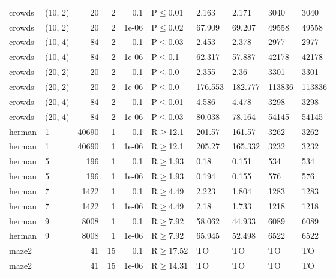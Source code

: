 \begin{longtable}{llrrrlllll}
 crowds        & (10, 2)   &     	20 &   2 & 0.1   & P$\leq$0.01  & 2.163    & 2.171    & 3040   & 3040   \\
 crowds        & (10, 2)   &     	20 &   2 & 1e-06 & P$\leq$0.02  & 67.909   & 69.207   & 49558  & 49558  \\
 crowds        & (10, 4)   &     	84 &   2 & 0.1   & P$\leq$0.03  & 2.453    & 2.378    & 2977   & 2977   \\
 crowds        & (10, 4)   &     	84 &   2 & 1e-06 & P$\leq$0.1   & 62.317   & 57.887   & 42178  & 42178  \\
 crowds        & (20, 2)   &     	20 &   2 & 0.1   & P$\leq$0.0   & 2.355    & 2.36     & 3301   & 3301   \\
 crowds        & (20, 2)   &     	20 &   2 & 1e-06 & P$\leq$0.0   & 176.553  & 182.777  & 113836 & 113836 \\
 crowds        & (20, 4)   &     	84 &   2 & 0.1   & P$\leq$0.01  & 4.586    & 4.478    & 3298   & 3298   \\
 crowds        & (20, 4)   &     	84 &   2 & 1e-06 & P$\leq$0.03  & 80.038   & 78.164   & 54145  & 54145  \\
 herman        & 1         &  	40690 &   1 & 0.1   & R$\geq$12.1  & 201.57   & 161.57   & 3262   & 3262   \\
 herman        & 1         &  	40690 &   1 & 1e-06 & R$\geq$12.1  & 205.27   & 165.332  & 3232   & 3232   \\
 herman        & 5         &    	196 &   1 & 0.1   & R$\geq$1.93  & 0.18     & 0.151    & 534    & 534    \\
 herman        & 5         &    	196 &   1 & 1e-06 & R$\geq$1.93  & 0.194    & 0.155    & 576    & 576    \\
 herman        & 7         &   	1422 &   1 & 0.1   & R$\geq$4.49  & 2.223    & 1.804    & 1283   & 1283   \\
 herman        & 7         &   	1422 &   1 & 1e-06 & R$\geq$4.49  & 2.18     & 1.733    & 1218   & 1218   \\
 herman        & 9         &   	8008 &   1 & 0.1   & R$\geq$7.92  & 58.062   & 44.933   & 6089   & 6089   \\
 herman        & 9         &   	8008 &   1 & 1e-06 & R$\geq$7.92  & 65.945   & 52.498   & 6522   & 6522   \\
 maze2         &           &     	41 &  15 & 0.1   & R$\geq$17.52 & TO       & TO       & TO     & TO     \\
 maze2         &           &     	41 &  15 & 1e-06 & R$\geq$14.31 & TO       & TO       & TO     & TO     \\

\end{longtable}
